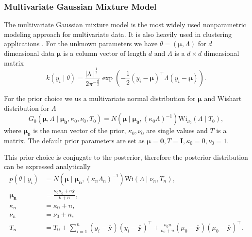 \documentclass[nojss]{jss}
\begin{document}
\subsubsection{Multivariate Gaussian Mixture Model}
The multivariate Gaussian mixture model is the most widely used nonparametric modeling approach for multivariate data. It is also heavily used in clustering applications \citep{maceachern_estimating_1998}. For the unknown parameters we have $\theta = ( \boldsymbol{\mu}, \Lambda )$ for $d$ dimensional data $\boldsymbol{\mu}$ is a column vector of length $d$ and $\Lambda$ is a $d \times d$ dimensional matrix
\begin{equation}
k(y_i \mid \theta) = \frac{\mid \lambda \mid ^{\frac{1}{2}}}{2 \pi ^{- \frac{d}{2}}} \exp \left( - \frac{1}{2} (y_i - \boldsymbol{\mu})^\top \Lambda (y_i - \boldsymbol{\mu})  \right).
\end{equation}

For the prior choice we us a multivariate normal distribution for $\boldsymbol{\mu}$ and Wishart distribution for $\Lambda$
\begin{equation}
G_0 (\boldsymbol{\mu} , \Lambda \mid  \boldsymbol{\mu _0} , \kappa _0, \nu _0, T_0)  = N ( \boldsymbol{\mu} \mid \boldsymbol{\mu _0} , (\kappa _0 \Lambda )^{-1} ) \text{Wi} _{\nu _0} (\Lambda \mid T_0),
\end{equation}
where $\boldsymbol{\mu _0}$ is the mean vector of the prior, $\kappa _0, \nu _0$ are single values and $T$ is a matrix. The default prior parameters are set as $\boldsymbol{\mu} = \mathbf{0}, T = \mathbf{I}, \kappa_0 = 0, \nu_0 = 1$.

This prior choice is conjugate to the posterior, therefore the posterior distribution can be expressed analytically
\begin{align*}
p(\theta \mid y_i ) & = N ( \boldsymbol{\mu} \mid \boldsymbol{\mu _n} , (\kappa _n \Lambda _n )^{-1}  ) \text{Wi} (\Lambda \mid \nu _n, T_n), \\
\boldsymbol{\mu _n} & = \frac{\kappa _0 \mu _0 + n \mathbf{\overline{{y}}}}{k + n}, \\
\kappa _n & = \kappa _0 + n, \\
\nu _n & = \nu _0 + n, \\
T_n & = T_0 + \sum _{i=1} ^n (y_i - \mathbf{\overline{{y}}}) ( y_i -  \mathbf{\overline{{y}}} ) ^\top + \frac{\kappa _0 n}{\kappa _0 + n} ( \mu _0 - \mathbf{\overline{{y}}} )( \mu _0 -  \mathbf{\overline{{y}}} ) ^\top.
\end{align*}
\end{document}
